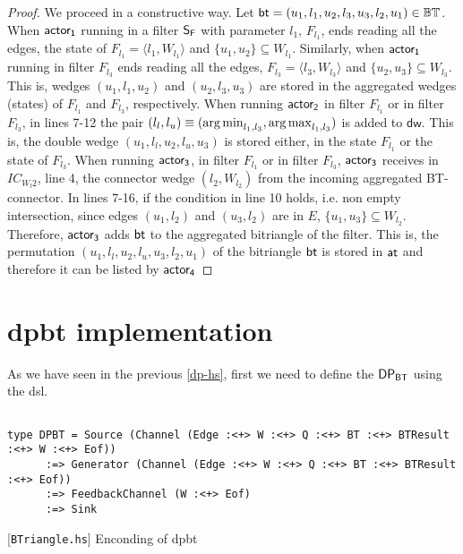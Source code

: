 \begin{proof}
We proceed in a constructive way. Let $\mathsf{bt} = (u_1,l_1,u_2,l_3,u_3,l_2,u_1) \in \mathbb{BT}$. 
When $\mathsf{actor_1}$ running in a filter $\mathsf{S_F}$ with parameter $l_1$, $F_{l_1}$, ends reading all the edges, the state of $F_{l_1} = \langle l_1,  W_{l_1}\rangle$ and  $\{u_1,u_2\} \subseteq W_{l_1}$. Similarly,  when $\mathsf{actor_1}$ running in filter $F_{l_3}$ ends reading all the edges,  $F_{l_3} = \langle l_3,  W_{l_3}\rangle$ and $\{u_2,u_3\} \subseteq W_{l_3}$. This is, wedges $(u_1,l_1,u_2)$ and $(u_2,l_3,u_3)$ are stored in the aggregated wedges (states) of $F_{l_1}$ and $F_{l_3}$, respectively. 
When running  $\mathsf{actor_2}$ in filter $F_{l_1}$ or in filter $F_{l_3}$, in lines 7-12 the pair 
$(l_l, l_u) \equiv (\operatorname*{arg\,min}_{l_1,l_3}, \operatorname*{arg\,max}_{l_1,l_3})$ is added to $\mathsf{dw}$. This is, the double wedge $(u_1,l_l,u_2,l_u,u_3)$ is stored either, in the state $F_{l_1}$ or the state of $F_{l_3}$. When running $\mathsf{actor_3}$, in filter $F_{l_1}$ or in filter $F_{l_3}$, $\mathsf{actor_3}$ receives in $IC_{W_l2}$, line 4, the connector wedge $(l_2, W_{l_2})$ from the incoming  aggregated BT-connector. In lines 7-16, if the condition in line 10 holds, i.e. non empty intersection, since edges $(u_1,l_2)$ and $(u_3,l_2)$ are in $E$, $\{u_1,u_3\} \subseteq W_{l_2}$. Therefore, $\mathsf{actor_3}$ adds  $\mathsf{bt}$  to the aggregated bitriangle of the filter. This is, the permutation  $(u_1,l_l,u_2,l_u,u_3,l_2,u_1)$ of the bitriangle $\mathsf{bt}$ is stored in $\mathsf{at}$ and therefore it can be listed by $\mathsf{actor_4}$
\end{proof}        
 
\section{\acrshort{dpbt} implementation}\label{sec:iebt:hs:imp}
As we have seen in the previous \autoref{dp-hs}, first we need to define the $\mathsf{DP_{BT}}$ using the \acrshort{dsl}.

\begin{listing}[htp!]
\begin{verbatim}

type DPBT = Source (Channel (Edge :<+> W :<+> Q :<+> BT :<+> BTResult :<+> W :<+> Eof))
      :=> Generator (Channel (Edge :<+> W :<+> Q :<+> BT :<+> BTResult :<+> Eof))
      :=> FeedbackChannel (W :<+> Eof)
      :=> Sink

\end{verbatim}
\caption{[\texttt{BTriangle.hs}] Enconding of \acrshort{dpbt}}
\label{src:dpbt:1}
\end{listing}

